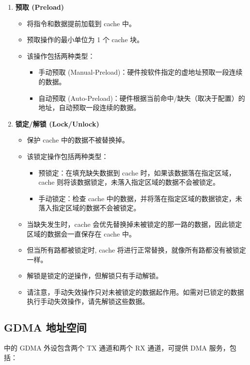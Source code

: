 \documentclass[main\_\_CN.tex]{subfiles}
\begin{document}
\begin{enumerate}
\item \textbf{预取 (Preload)}
\begin{itemize}
    \item 将指令和数据提前加载到 cache 中。
    \item 预取操作的最小单位为 1 个 cache 块。
    \item 该操作包括两种类型：
    \begin{itemize}
    \item 手动预取 (Manual-Preload)：硬件按软件指定的虚地址预取一段连续的数据。
    \item 自动预取 (Auto-Preload)：硬件根据当前命中/缺失（取决于配置）的地址，自动预取一段连续的数据。
    \end{itemize}
\end{itemize}

\item \textbf{锁定/解锁 (Lock/Unlock)}
\begin{itemize}
    \item 保护 cache 中的数据不被替换掉。
    \item 该锁定操作包括两种类型：
    \begin{itemize}
    \item 预锁定：在填充缺失数据到 cache 时，如果该数据落在指定区域，cache 则将该数据锁定，未落入指定区域的数据不会被锁定。
    \item 手动锁定：检查 cache 中的数据，并将落在指定区域的数据锁定，未落入指定区域的数据不会被锁定。
    \end{itemize}
    \item 当缺失发生时，cache 会优先替换掉未被锁定的那一路的数据，因此锁定区域的数据会一直保存在 cache 中。
    \item 但当所有路都被锁定时, cache 将进行正常替换，就像所有路都没有被锁定一样。
    \item 解锁是锁定的逆操作，但解锁只有手动解锁。
    \item 请注意，手动失效操作只对未被锁定的数据起作用。如需对已锁定的数据执行手动失效操作，请先解锁这些数据。
    
\end{itemize}
\end{enumerate}

\subsection{GDMA 地址空间}

\chipname{} 中的 GDMA 外设包含两个 TX 通道和两个 RX 通道，可提供 DMA 服务，包括：
\end{document}
